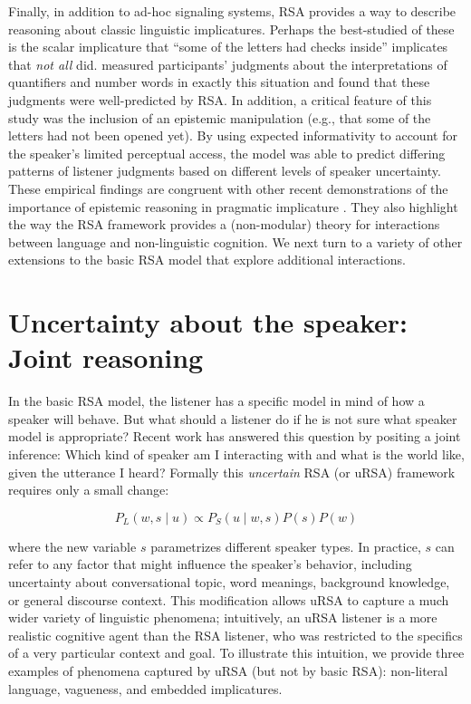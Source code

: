\documentclass[]{elsarticle}
\begin{document}
Finally, in addition to ad-hoc signaling systems, RSA provides a way to describe reasoning about classic linguistic
implicatures. Perhaps the
best-studied of these is the scalar implicature that ``some of the
letters had checks inside'' implicates that \emph{not all} did. \citet{goodman2013} measured participants' judgments about the
interpretations of quantifiers and number words in exactly this
situation and found that these judgments were well-predicted by RSA. In
addition, a critical feature of this study was the inclusion of an
epistemic manipulation (e.g., that some of the letters had not been opened
yet). By using expected informativity to account for the speaker's
limited perceptual access, the model was able to predict
differing patterns of listener judgments based on different levels of
speaker uncertainty. These empirical findings are congruent with other recent
demonstrations of the importance of epistemic reasoning in pragmatic
implicature \citep[e.g.,]{bergen2012,breheny2013}. They
also highlight the way the RSA framework provides a (non-modular) theory
for interactions between language and non-linguistic cognition.
We next turn to a variety of other extensions to the basic RSA model that explore additional interactions.

\section{Uncertainty about the speaker: Joint reasoning}\label{uncertainty-about-the-speaker-joint-reasoning}

In the basic RSA model, the listener has a specific model in mind of how
a speaker will behave. But what should a listener do if he is not sure
what speaker model is appropriate? Recent work has answered this
question by positing a joint inference: Which kind of speaker am I
interacting with and what is the world like, given the utterance I
heard? Formally this \emph{uncertain} RSA (or uRSA) framework requires
only a small change:

$$P_L(w,s\mid u) \propto
P_S(u\mid w,s)P(s)P(w)$$

where the new variable $s$ parametrizes different speaker types. In practice, $s$ can
refer to any factor that might influence the speaker's behavior,
including uncertainty about conversational topic, word
meanings, background knowledge, or general discourse context.
This modification allows uRSA to capture a much wider variety of
linguistic phenomena; intuitively, an uRSA listener is a more realistic
cognitive agent than the RSA listener, who was restricted to the
specifics of a very particular context and goal. To illustrate this
intuition, we provide three examples of phenomena captured by uRSA (but not by basic RSA): non-literal language, vagueness, and embedded implicatures.
\end{document}
